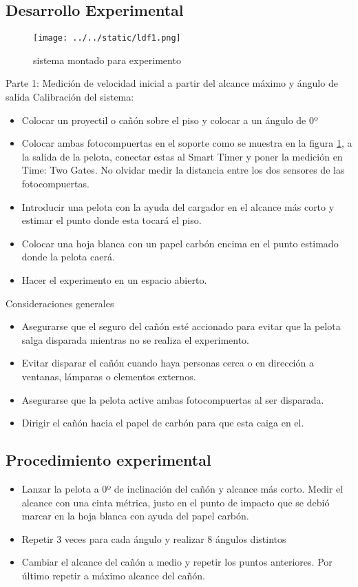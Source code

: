 \documentclass{article}
\begin{document}
\begin{multicols}{2}
\section{Desarrollo Experimental}\label{Desarrollo experimental}				%
\begin{figure}[H]
	\centering
	\texttt{[image: ../../static/ldf1.png]}
	\caption{sistema montado para experimento}
	\label{fig:1}
\end{figure}
Parte 1: Medición de velocidad inicial a partir del alcance máximo y ángulo de salida
Calibración del sistema:
\begin{itemize}[label=$*$]
 \item Colocar un proyectil o cañón sobre el piso y colocar a un ángulo de 0º
 \item Colocar ambas fotocompuertas en el soporte como se muestra en la figura \ref{fig:1}, a la salida de la pelota, conectar estas
al Smart Timer y poner la medición en Time: Two Gates. No olvidar medir la distancia
entre los dos sensores de las fotocompuertas.
 \item Introducir una pelota con la ayuda del cargador en el alcance más corto y estimar el
punto donde esta tocará el piso.
 \item Colocar una hoja blanca con un papel carbón encima en el punto estimado donde la
pelota caerá.
\item Hacer el experimento en un espacio abierto.
\end{itemize}

Consideraciones generales
\begin{itemize}[label=$*$]
	\item Asegurarse que el seguro del cañón esté accionado para evitar que la pelota salga
disparada mientras no se realiza el experimento.
	\item Evitar disparar el cañón cuando haya personas cerca o en dirección a ventanas,
lámparas o elementos externos.
\item Asegurarse que la pelota active ambas fotocompuertas al ser disparada.
\item Dirigir el cañón hacia el papel de carbón para que esta caiga en el.
\end{itemize}

\subsection{Procedimiento experimental}\label{Procedimiento experimental} %
\begin{itemize}[label=$*$]
	\item Lanzar la pelota a 0º de inclinación del cañón y alcance más corto. Medir el alcance
con una cinta métrica, justo en el punto de impacto que se debió marcar en la hoja
blanca con ayuda del papel carbón.
\item Repetir 3 veces para cada ángulo y realizar 8 ángulos distintos
\item Cambiar el alcance del cañón a medio y repetir los puntos anteriores. Por último
repetir a máximo alcance del cañón.

\end{itemize}

\end{multicols}
\end{document}
